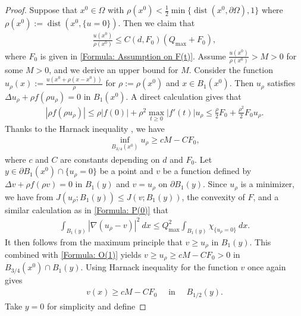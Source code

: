 \documentclass[11pt,reqno]{amsart}
\begin{document}
\begin{proof}
	Suppose that $x^{0}\in\Omega$ with $\rho(x^{0})<\frac{1}{2}\min\{\operatorname{dist}(x^{0},\partial\Omega),1\}$ where $\rho(x^{0}):=\operatorname{dist}(x^{0},\{u=0\})$. Then we claim that
	\begin{align}\label{Formula: O('0)}
		\frac{u(x^{0})}{\rho(x^{0})}\leqslant C(d,F_{0})(Q_{\mathrm{max}}+F_{0}),
	\end{align}
    where $F_{0}$ is given in \eqref{Formula: Assumption on F(t)}. Assume $\tfrac{u(x^{0})}{\rho(x^{0})}>M>0$ for some $M>0$, and we derive an upper bound for $M$. Consider the function $u_{\rho}(x):=\frac{u(x^{0}+\rho(x-x^{0}))}{\rho}$ for $\rho:=\rho(x^{0})$ and $x\in B_{1}(x^{0})$. Then $u_{\rho}$ satisfies $\Delta u_{\rho}+\rho f(\rho u_{\rho})=0$ in $B_{1}(x^{0})$. A direct calculation gives that
    \begin{align}\label{Formula: O(0)}
    	|\rho f(\rho u_{\rho})|\leqslant\rho|f(0)|+\rho^{2}\max_{t\geqslant0}|f'(t)|u_{\rho}\leqslant\frac{\rho}{2}F_{0}+\frac{\rho^{2}}{2}F_{0}u_{\rho}.
    \end{align}
    Thanks to the Harnack inequality \cite[Corollary 1.1]{T1967}, we have
    \begin{align}\label{Formula: O(1)}
    	\inf_{B_{3/4}(x^{0})}u_{\rho}\geqslant cM-CF_{0},
    \end{align}
    where $c$ and $C$ are constants depending on $d$ and $F_{0}$. Let $y\in\partial B_{1}(x^{0})\cap\{u_{\rho}=0\}$ be a point and $v$ be a function defined by $\Delta v+\rho f(\rho v)=0$ in $B_{1}(y)$ and $v=u_{\rho}$ on $\partial B_{1}(y)$. Since $u_{\rho}$ is a minimizer, we have from  $J(u_{\rho};B_{1}(y))\leqslant J(v;B_{1}(y))$, the convexity of $F$, and a similar calculation as in \eqref{Formula: P(0)} that
    \begin{align}\label{Formula: O(2)}
    	\int_{B_{1}(y)}|\nabla(u_{\rho}-v)|^{2}\:dx\leqslant Q_{\mathrm{max}}^{2}\int_{B_{1}(y)}\chi_{\{u_{\rho}=0\}}\:dx.
    \end{align}
    It then follows from the maximum principle that $v\geqslant u_{\rho}$ in $B_{1}(y)$. This combined with \eqref{Formula: O(1)} yields $v\geqslant u_{\rho}\geqslant cM-CF_{0}>0$ in $B_{3/4}(x^{0})\cap B_{1}(y)$. Using Harnack inequality \cite[Corollary 1.1]{T1967} for the function $v$ once again gives
    \begin{align}\label{Formula: O(3)}
    	v(x)\geqslant cM-CF_{0}\quad\text{ in }\quad B_{1/2}(y).
    \end{align}
    Take $y=0$ for simplicity and define

\end{proof}
\end{document}
